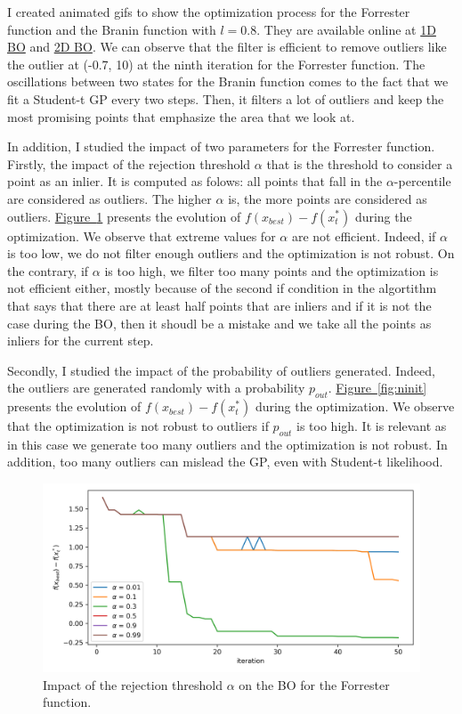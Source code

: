 \documentclass{article}
\newcommand{\figref}[1]{\hyperref[#1]{Figure~\ref{#1}}}
\begin{document}
I created animated gifs to show the optimization process for the Forrester function and the Branin function with $l=0.8$.
They are available online at \href{https://github.com/tms-gvd/project_bl/blob/main/1d_bo.gif}{1D BO} and \href{https://github.com/tms-gvd/project_bl/blob/main/2d_bo.gif}{2D BO}. We can observe that the filter is efficient to remove outliers like the outlier at (-0.7, 10) at the ninth iteration for the Forrester function. The oscillations between two states for the Branin function comes to the fact that we fit a Student-t GP every two steps. Then, it filters a lot of outliers and keep the most promising points that emphasize the area that we look at.

In addition, I studied the impact of two parameters for the Forrester function. Firstly, the impact of the rejection threshold $\alpha$ that is the threshold to consider a point as an inlier. It is computed as folows: all points that fall in the $\alpha$-percentile are considered as outliers. The higher $\alpha$ is, the more points are considered as outliers. \figref{fig:alpha} presents the evolution of $f(x_{best}) - f(x^*_t)$ during the optimization. We observe that extreme values for $\alpha$ are not efficient. Indeed, if $\alpha$ is too low, we do not filter enough outliers and the optimization is not robust. On the contrary, if $\alpha$ is too high, we filter too many points and the optimization is not efficient either, mostly because of the second if condition in the algortithm that says that there are at least half points that are inliers and if it is not the case during the BO, then it shoudl be a mistake and we take all the points as inliers for the current step.

Secondly, I studied the impact of the probability of outliers generated. Indeed, the outliers are generated randomly with a probability $p_{out}$. \figref{fig:ninit} presents the evolution of $f(x_{best}) - f(x^*_t)$ during the optimization. We observe that the optimization is not robust to outliers if $p_{out}$ is too high. It is relevant as in this case we generate too many outliers and the optimization is not robust. In addition, too many outliers can mislead the GP, even with Student-t likelihood.

\begin{figure}[ht]
  \centering
  \includegraphics[width=.8\linewidth]{imgs/alpha.png}
  \caption{Impact of the rejection threshold $\alpha$ on the BO for the Forrester function.}
  \label{fig:alpha}
\end{figure}
\end{document}
